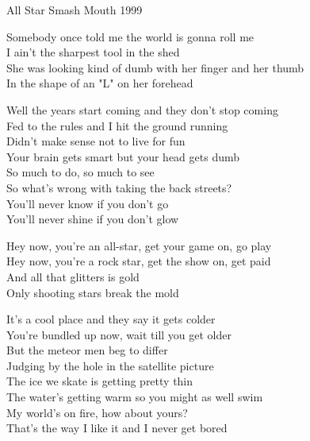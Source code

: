 \begin{song}{All Star}
  {} %
  {\SBOrgMel} %
  {Smash Mouth} %
  {1999} %
  {\NotCCLIed} %

  \begin{SBSection*}
    Somebody once told me the world is gonna roll me\\
    I ain't the sharpest tool in the shed\\
    She was looking kind of dumb with her finger and her thumb\\
    In the shape of an "L" on her forehead
  \end{SBSection*}

  \begin{SBVerse}
    Well the years start coming and they don't stop coming\\
    Fed to the rules and I hit the ground running\\
    Didn't make sense not to live for fun\\
    Your brain gets smart but your head gets dumb\\\medskip
    So much to do, so much to see\\
    So what's wrong with taking the back streets?\\
    You'll never know if you don't go\\
    You'll never shine if you don't glow
  \end{SBVerse}

  \begin{SBChorus}
    Hey now, you're an all-star, get your game on, go play\\
    Hey now, you're a rock star, get the show on, get paid\\
    And all that glitters is gold\\
    Only shooting stars break the mold
  \end{SBChorus}

  \begin{SBVerse}
    It's a cool place and they say it gets colder\\
    You're bundled up now, wait till you get older\\
    But the meteor men beg to differ\\
    Judging by the hole in the satellite picture\\\medskip
    The ice we skate is getting pretty thin\\
    The water's getting warm so you might as well swim\\
    My world's on fire, how about yours?\\
    That's the way I like it and I never get bored
  \end{SBVerse}


\end{song}
